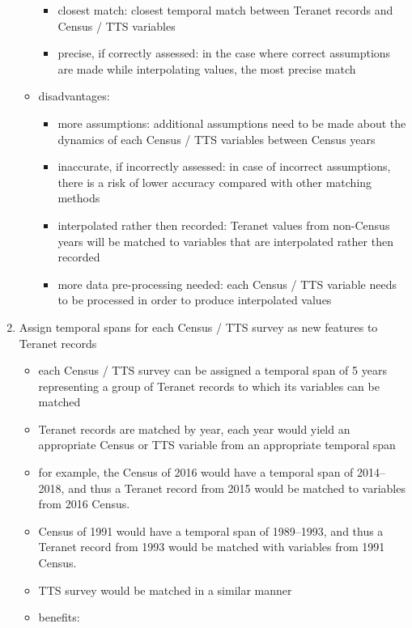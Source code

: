 \begin{enumerate}
\begin{itemize}
\begin{itemize}
            \item closest match: closest temporal match between Teranet records and Census / TTS variables
            \item precise, if correctly assessed: in the case where correct assumptions are made while interpolating values, the most precise match
        \end{itemize}
        \item disadvantages:
        \begin{itemize}
            \item more assumptions: additional assumptions need to be made about the dynamics of each Census / TTS variables between Census years
            \item inaccurate, if incorrectly assessed: in case of incorrect assumptions, there is a risk of lower accuracy compared with other matching methods
            \item interpolated rather then recorded: Teranet values from non-Census years will be matched to variables that are interpolated rather then recorded
            \item more data pre-processing needed: each Census / TTS variable needs to be processed in order to produce interpolated values
        \end{itemize}
    \end{itemize}
    \item Assign temporal spans for each Census / TTS survey as new features to Teranet records
    \begin{itemize}
        \item each Census / TTS survey can be assigned a temporal span of 5 years representing a group of Teranet records to which its variables can be matched
        \item Teranet records are matched by year, each year would yield an appropriate Census or TTS variable from an appropriate temporal span
        \item for example, the Census of 2016 would have a temporal span of 2014--2018, and thus a Teranet record from 2015 would be matched to variables from 2016 Census.
        \item Census of 1991 would have a temporal span of 1989--1993, and thus a Teranet record from 1993 would be matched with variables from 1991 Census.
        \item TTS survey would be matched in a similar manner
        \item benefits:
        \begin{itemize}

\end{itemize}
\end{itemize}
\end{enumerate}
